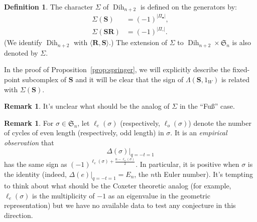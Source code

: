 \documentclass[11pt]{article}
\theoremstyle{definition}
\newtheorem{defi}[theo]{Definition}
\newtheorem{rema}[theo]{Remark}
\DeclareMathOperator{\dih}{Dih}
\newcommand{\RR}{\mathcal{R}}
\renewcommand{\SS}{\mathcal{S}}
\newcommand{\FFF}{\mathbf{F}}
\newcommand{\RRR}{\mathbf{R}}
\newcommand{\SSS}{\mathbf{S}}
\begin{document}
\begin{defi} \label{def:sigma}
    The character $\Sigma$ of $\dih_{n+2}$ is defined on the generators by:
    \begin{align*}
        \Sigma (\SSS) &= (-1)^{|\Pi_\bullet|},\\
        \Sigma (\SSS\RRR) &= (-1)^{|\Pi_\circ|}.
    \end{align*}
    (We identify $\dih_{n+2}$ with $\langle \RRR,\SSS\rangle$.)  The extension of $\Sigma$ to $\dih_{n+2}\times\mathfrak{S}_n$ is also denoted by $\Sigma$.
\end{defi}

In the proof of Proposition~\ref{prop:springer}, we will explicitly describe the fixed-point subcomplex of $\SSS$ and it will be clear that the sign of $\Lambda(\SSS,1_W)$ is related with $\Sigma(\SSS)$.

\begin{rema}
    It's unclear what should be the analog of $\Sigma$ in the ``Fuß'' case.  %
\end{rema}

\begin{rema}
    For $\sigma\in\mathfrak{S}_n$, let $\ell_e(\sigma)$ (respectively, $\ell_o(\sigma)$) denote the number of cycles of even length (respectively, odd length) in $\sigma$.  It is an {\it empirical observation} that 
    \[
        \varDelta(\sigma)\big\vert_{q=-t=1}
    \]
    has the same sign as $(-1)^{\ell_e(\sigma)+\frac{n-\ell_o(\sigma)}{2}}$.  In particular, it is positive when $\sigma$ is the identity (indeed, $\varDelta(e)\big\vert_{q=-t=1} = E_n$, the $n$th Euler number).  It's tempting to think about what should be the Coxeter theoretic analog (for example, $\ell_e(\sigma)$ is the multiplicity of $-1$ as an eigenvalue in the geometric representation) but we have no available data to test any conjecture in this direction.
\end{rema}


\end{document}
